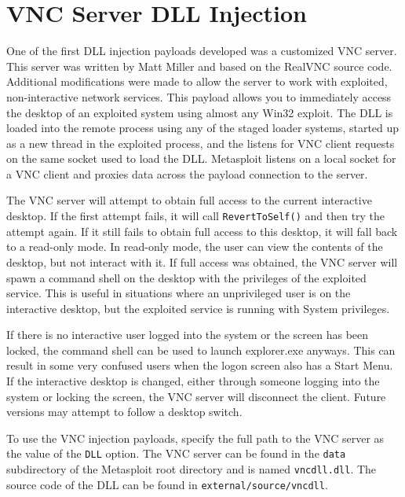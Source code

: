 \documentclass{report}
\begin{document}
\section{VNC Server DLL Injection}

\par
One of the first DLL injection payloads developed was a customized VNC server.
This server was written by Matt Miller and based on the RealVNC source code.
Additional modifications were made to allow the server to work with exploited,
non-interactive network services. This payload allows you to immediately access
the desktop of an exploited system using almost any Win32 exploit. The DLL is
loaded into the remote process using any of the staged loader systems, started
up as a new thread in the exploited process, and the listens for VNC client
requests on the same socket used to load the DLL. Metasploit listens on a local
socket for a VNC client and proxies data across the payload connection to the
server.

\par
The VNC server will attempt to obtain full access to the current interactive
desktop. If the first attempt fails, it will call \texttt{RevertToSelf()} and
then try the attempt again. If it still fails to obtain full access to this
desktop, it will fall back to a read-only mode. In read-only mode, the user can
view the contents of the desktop, but not interact with it. If full access was
obtained, the VNC server will spawn a command shell on the desktop with the
privileges of the exploited service. This is useful in situations where an
unprivileged user is on the interactive desktop, but the exploited service is
running with System privileges.

\par
If there is no interactive user logged into the system or the screen has been
locked, the command shell can be used to launch explorer.exe anyways. This can
result in some very confused users when the logon screen also has a Start Menu.
If the interactive desktop is changed, either through someone logging into the
system or locking the screen, the VNC server will disconnect the client. Future
versions may attempt to follow a desktop switch.

\par
To use the VNC injection payloads, specify the full path to the VNC server as
the value of the \texttt{DLL} option. The VNC server can be found in the
\texttt{data} subdirectory of the Metasploit root directory and is named
\texttt{vncdll.dll}. The source code of the DLL can be found in
\texttt{external/source/vncdll}.
\end{document}
